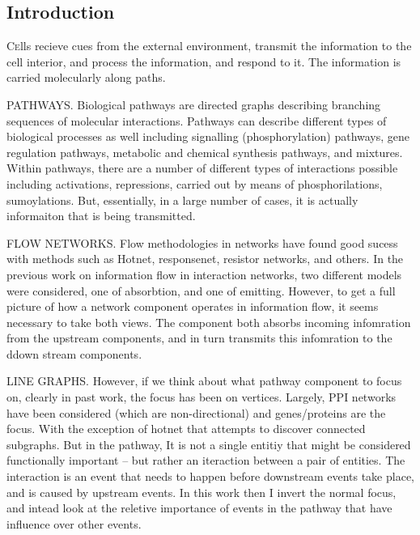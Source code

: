 \documentclass[twoside]{article}
\begin{document}
\begin{multicols}{2} %

\section{Introduction}

\lettrine[nindent=0em,lines=2]{C}ells recieve cues from the external environment, transmit the
information to the cell interior, and process the information, and
respond to it. The information is carried molecularly along paths.

PATHWAYS. Biological pathways are directed graphs describing branching sequences of molecular
interactions. Pathways can describe different types of biological
processes as well including signalling (phosphorylation) pathways,
gene regulation pathways, metabolic and chemical synthesis pathways,
and mixtures. Within pathways, there are a number of different types
of interactions possible including activations, repressions, carried out by means of
phosphorilations, sumoylations. But, essentially, in a large number of
cases, it is actually informaiton that is being transmitted.

FLOW NETWORKS. Flow methodologies in networks have found good sucess with methods
such as Hotnet, responsenet, resistor networks, and others. 
In the previous work on information flow in interaction networks, two
different models were considered, one of absorbtion, and one of
emitting. However, to get a full picture of how a network component
operates in information flow, it seems necessary to take both
views. The component both absorbs incoming infomration from the
upstream components, and in turn transmits this infomration to the
ddown stream components. 

LINE GRAPHS. However, if we think about what pathway component to focus on, clearly
in past work, the focus has been on vertices. Largely, PPI networks
have been considered (which are non-directional) and genes/proteins
are the focus. With the exception of hotnet that attempts to discover
connected subgraphs. But in the pathway, It is not a single entitiy
that might be considered functionally important -- but rather an
iteraction between a pair of entities. The interaction is an event
that needs to happen before downstream events take place, and is
caused by upstream events. In this work then I invert the normal
focus, and intead look at the reletive importance of events in the
pathway that have influence over other events.


\end{multicols}
\end{document}
